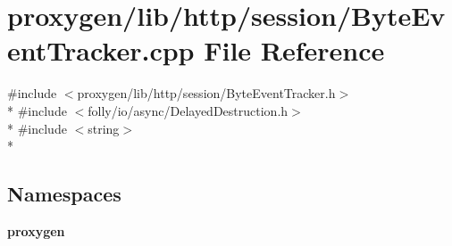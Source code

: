 \section{proxygen/lib/http/session/\+Byte\+Event\+Tracker.cpp File Reference}
\label{ByteEventTracker_8cpp}
{\ttfamily \#include $<$proxygen/lib/http/session/\+Byte\+Event\+Tracker.\+h$>$}\\*
{\ttfamily \#include $<$folly/io/async/\+Delayed\+Destruction.\+h$>$}\\*
{\ttfamily \#include $<$string$>$}\\*
\subsection*{Namespaces}
\begin{DoxyCompactItemize}
\item 
 {\bf proxygen}
\end{DoxyCompactItemize}
